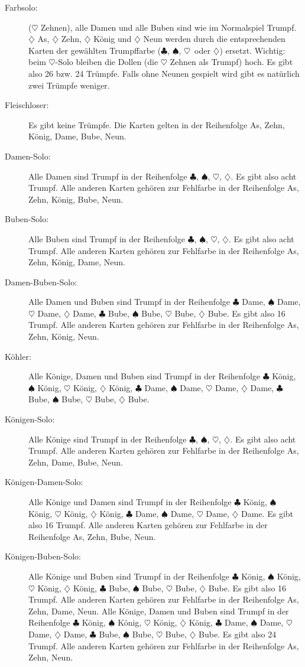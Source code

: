 \documentclass{scrartcl}
\newcommand{\kreuz}{$\clubsuit$\xspace}
\newcommand{\pik}{$\spadesuit$\xspace}
\newcommand{\herz}{$\heartsuit$\xspace}
\newcommand{\karo}{$\diamondsuit$\xspace}
\begin{document}
\begin{description}
  \item[Farbsolo:]
    (\herz Zehnen), alle
    Damen und alle Buben sind wie im Normalspiel Trumpf. \karo As,
    \karo Zehn, \karo König und \karo Neun werden durch die
    entsprechenden Karten der gewählten Trumpffarbe (\kreuz, \pik,
    \herz\ oder \karo) ersetzt. Wichtig: beim \herz-Solo bleiben die
    Dollen (die \herz Zehnen als Trumpf) hoch. Es gibt also 26 bzw.
    24 Trümpfe. Falls ohne Neunen gespielt wird gibt es natürlich
    zwei Trümpfe weniger.
  \item[Fleischloser:]
    Es gibt keine Trümpfe. Die Karten gelten in der Reihenfolge As,
    Zehn, König, Dame, Bube, Neun.
  \item[Damen-Solo:]
    Alle Damen sind Trumpf in der Reihenfolge \kreuz, \pik, \herz,
    \karo. Es gibt also acht Trumpf. Alle anderen Karten gehören zur
    Fehlfarbe in der Reihenfolge As, Zehn, König, Bube, Neun.
  \item[Buben-Solo:]
    Alle Buben sind Trumpf in der Reihenfolge \kreuz, \pik, \herz,
    \karo. Es gibt also acht Trumpf. Alle anderen Karten gehören zur
    Fehlfarbe in der Reihenfolge As, Zehn, König, Dame, Neun.
  \item[Damen-Buben-Solo:]
    Alle Damen und Buben sind Trumpf in der Reihenfolge \kreuz Dame,
    \pik Dame, \herz Dame, \karo Dame, \kreuz Bube, \pik Bube, \herz
    Bube, \karo Bube. Es gibt also 16 Trumpf. Alle anderen Karten
    gehören zur Fehlfarbe in der Reihenfolge As, Zehn, König, Neun.
  \item[Köhler:]
    Alle Könige, Damen und Buben sind Trumpf in der Reihenfolge
    \kreuz König, \pik König, \herz König, \karo König,
    \kreuz Dame, \pik Dame, \herz Dame, \karo Dame,
    \kreuz Bube, \pik Bube, \herz Bube, \karo Bube.
  \item[Königen-Solo:]
    Alle Könige sind Trumpf in der Reihenfolge \kreuz, \pik, \herz,
    \karo. Es gibt also acht Trumpf. Alle anderen Karten gehören zur
    Fehlfarbe in der Reihenfolge As, Zehn, Dame, Bube, Neun.
  \item[Königen-Damen-Solo:]
    Alle Könige und Damen sind Trumpf in der Reihenfolge \kreuz
    König, \pik König, \herz König, \karo König, \kreuz Dame, \pik
    Dame, \herz Dame, \karo Dame. Es gibt also 16 Trumpf. Alle anderen
    Karten gehören zur Fehlfarbe in der Reihenfolge As, Zehn, Bube,
    Neun.
  \item[Königen-Buben-Solo:]
    Alle Könige und Buben sind Trumpf in der Reihenfolge \kreuz
    König, \pik König, \herz König, \karo König, \kreuz Bube, \pik
    Bube, \herz Bube, \karo Bube. Es gibt also 16 Trumpf. Alle anderen
    Karten gehören zur Fehlfarbe in der Reihenfolge As, Zehn, Dame,
    Neun. Alle Könige, Damen und Buben sind Trumpf in der Reihenfolge
    \kreuz König, \pik König, \herz König, \karo König, \kreuz
    Dame, \pik Dame, \herz Dame, \karo Dame, \kreuz Bube, \pik Bube,
    \herz Bube, \karo Bube. Es gibt also 24 Trumpf. Alle anderen
    Karten gehören zur Fehlfarbe in der Reihenfolge As, Zehn, Neun.
\end{description}
\end{document}
